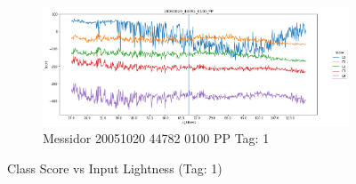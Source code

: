 \begin{figure}[ht!]
\begin{subfigure}[b]{ 0.85\textwidth}
		\centering
		\includegraphics[width=\textwidth]{Figures/chapter_stability/20051020_44782_0100_PP/l/scores.png}
		\caption{Messidor 20051020 44782 0100 PP Tag: 1}		
	\end{subfigure}
	\hfill 
	\caption[Score vs Lightness (Tag: 1)]{Class Score vs Input Lightness (Tag: 1)}  
	\label{sta:fig:lig1} 
\end{figure}

